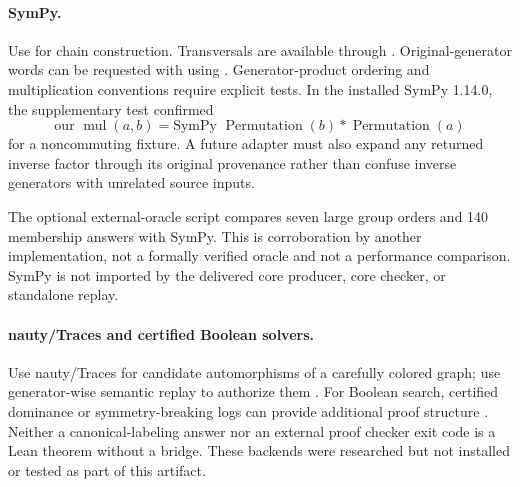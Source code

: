 \paragraph{SymPy.}
Use  for chain construction. Transversals are available through . Original-generator words can be requested with  using  \cite{sympy}. Generator-product ordering and multiplication conventions require explicit tests. In the installed SymPy 1.14.0, the supplementary test confirmed
\[
  \text{our }\operatorname{mul}(a,b)
  =\text{SymPy }\operatorname{Permutation}(b)*\operatorname{Permutation}(a)
\]
for a noncommuting fixture. A future adapter must also expand any returned inverse factor through its original provenance rather than confuse inverse generators with unrelated source inputs.

The optional external-oracle script compares seven large group orders and 140 membership answers with SymPy. This is corroboration by another implementation, not a formally verified oracle and not a performance comparison. SymPy is not imported by the delivered core producer, core checker, or standalone replay.

\paragraph{nauty/Traces and certified Boolean solvers.}
Use nauty/Traces for candidate automorphisms of a carefully colored graph; use generator-wise semantic replay to authorize them \cite{nauty}. For Boolean search, certified dominance or symmetry-breaking logs can provide additional proof structure \cite{cert-symmetry,aux-orders}. Neither a canonical-labeling answer nor an external proof checker exit code is a Lean theorem without a bridge. These backends were researched but not installed or tested as part of this artifact.

